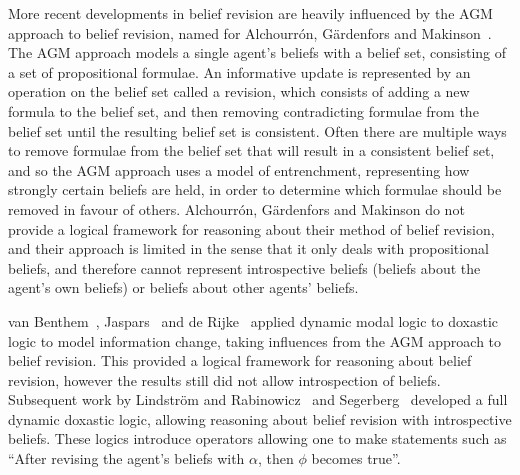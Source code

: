 More recent developments in belief revision are heavily influenced by the AGM
approach to belief revision, named for Alchourr{\'o}n, G{\"a}rdenfors
and Makinson~\cite{alchourron:1985}. The AGM approach models a single agent's
beliefs with a belief set, consisting of a set of propositional formulae. An
informative update is represented by an operation on the belief set called a
revision, which consists of adding a new formula to the belief set, and then
removing contradicting formulae from the belief set until the resulting belief
set is consistent. Often there are multiple ways to remove formulae from the
belief set that will result in a consistent belief set, and so the AGM approach
uses a model of entrenchment, representing how strongly certain beliefs are
held, in order to determine which formulae should be removed in favour of
others. Alchourr{\'o}n, G{\"a}rdenfors and Makinson do not provide a logical
framework for reasoning about their method of belief revision, and their
approach is limited in the sense that it only deals with propositional beliefs,
and therefore cannot represent introspective beliefs (beliefs about the agent's
own beliefs) or beliefs about other agents' beliefs. 

van Benthem~\cite{vanbenthem:1989, vanbenthem:1994, vanbenthem:1996},
Jaspars~\cite{jaspars:1994} and de Rijke~\cite{derijke:1994} applied dynamic modal
logic to doxastic logic to model information change, taking influences from the
AGM approach to belief revision. This provided a logical framework for reasoning
about belief revision, however the results still did not allow introspection of
beliefs.  Subsequent work by Lindstr{\"o}m and Rabinowicz~\cite{lindstrom:1999a,
lindstrom:1999b} and Segerberg~\cite{segerberg:1999a, segerberg:1999b} developed a
full dynamic doxastic logic, allowing reasoning about belief revision with
introspective beliefs. These logics introduce operators allowing one to make
statements such as ``After revising the agent's beliefs with $\alpha$, then
$\phi$ becomes true''.


